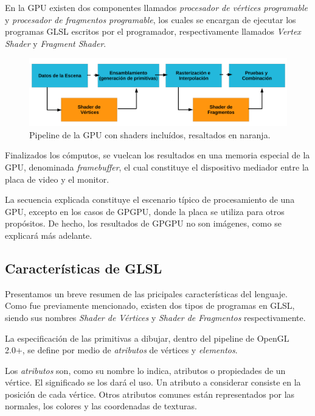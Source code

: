 En la GPU existen dos componentes llamados {\em procesador de v\'ertices programable} y {\em procesador de fragmentos programable}, los cuales se encargan de ejecutar los programas GLSL escritos por el programador, respectivamente llamados {\em Vertex Shader} y {\em Fragment Shader}.

\begin{figure}[h]
\begin{center}
\includegraphics[width=13cm]{figures/pipelinegrafico}
\end{center}
\caption[Pipeline de la GPU con shaders incluídos]{Pipeline de la GPU con shaders incluídos, resaltados en naranja.}
\label{fg:pipelinegrafico}
\end{figure}

Finalizados los cómputos, se vuelcan los resultados en una memoria especial de la GPU, denominada {\em framebuffer}, el cual constituye el dispositivo mediador entre la placa de video y el monitor.

La secuencia explicada constituye el escenario típico de procesamiento de una GPU, excepto en los casos de GPGPU, donde la placa se utiliza para otros propósitos.
De hecho, los resultados de GPGPU no son imágenes, como se explicará más adelante.


\subsection{Características de GLSL}
Presentamos un breve resumen de las pricipales caracter\'isticas del lenguaje.
Como fue previamente mencionado, existen dos tipos de programas en GLSL, siendo sus nombres {\em Shader de Vértices} y {\em Shader de Fragmentos} respectivamente.

La especificación de las primitivas a dibujar, dentro del pipeline de OpenGL 2.0+, se define por medio de {\em atributos} de vértices y {\em elementos}. 


Los \emph{atributos} son, como su nombre lo indica, atributos o propiedades de un vértice.
El significado se los dará el uso.
Un atributo a considerar consiste en la posición de cada vértice.
Otros atributos comunes están representados por las normales, los colores y las coordenadas de texturas.

